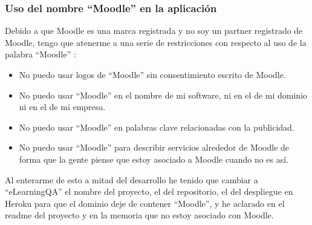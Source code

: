 \subsubsection{Uso del nombre ``Moodle'' en la aplicación}
Debido a que Moodle es una marca registrada y no soy un partner registrado de Moodle, tengo que atenerme a una serie de restricciones con respecto al uso de la palabra ``Moodle'' \cite{moodletrademark-2022}:
\begin{itemize}
	\item No puedo usar logos de ``Moodle'' sin consentimiento escrito de Moodle.
	\item No puedo usar ``Moodle'' en el nombre de mi software, ni en el de mi dominio ni en el de mi empresa.
	\item No puedo usar ``Moodle'' en palabras clave relacionadas con la publicidad.
	\item No puedo usar ``Moodle'' para describir servicios alrededor de Moodle de forma que la gente piense que estoy asociado a Moodle cuando no es así.
\end{itemize}

Al enterarme de esto a mitad del desarrollo he tenido que cambiar a ``eLearningQA'' el nombre del proyecto, el del repositorio, el del despliegue en Heroku para que el dominio deje de contener ``Moodle'', y he aclarado en el readme del proyecto y en la memoria que no estoy asociado con Moodle.
